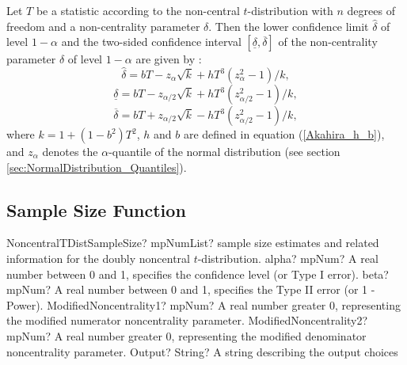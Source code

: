 \vspace{0.3cm}
Let $T$ be a statistic according to the non-central $t$-distribution
with $n$ degrees of freedom and a non-centrality parameter $\delta$. Then
the lower confidence limit $\widehat{\delta}$ of level $1-\alpha$ and the two-sided confidence interval $[ \underline{\delta},\overline{\delta}]$ of the
non-centrality parameter $\delta$ of level $1-\alpha$ are given by \cite{akahira_1995}:
\begin{equation}
\widehat{\delta} = bT - z_\alpha \sqrt{k} +  h T^3 (z_\alpha^2 - 1)/k,
\end{equation} 
\begin{equation}
\underline{\delta} = bT - z_{\alpha/2} \sqrt{k} +  h T^3 (z_{\alpha/2}^2 - 1)/k,
\end{equation} 
\begin{equation}
\overline{\delta} = bT + z_{\alpha/2} \sqrt{k} -  h T^3 (z_{\alpha/2}^2 - 1)/k,
\end{equation} 
where $k=1+(1-b^2)T^2$, $h$ and $b$ are defined in equation (\ref{Akahira_h_b}), and $z_\alpha$ denotes the $\alpha$-quantile of the normal distribution (see section \ref{sec:NormalDistribution_Quantiles}).





\subsection{Sample Size Function}
\label{NoncentralTDistributionSampleSize}

\begin{mpFunctionsExtract}
	\mpFunctionFiveNotImplemented
	{NoncentralTDistSampleSize? mpNumList? sample size estimates and related information for the doubly noncentral $t$-distribution.}
	{alpha? mpNum? A real number between 0 and 1, specifies the confidence level (or Type I error).}
	{beta? mpNum?  A real number between 0 and 1, specifies the Type II error (or 1 - Power).}
	{ModifiedNoncentrality1? mpNum? A real number greater 0, representing the modified numerator noncentrality parameter.}
	{ModifiedNoncentrality2? mpNum? A real number greater 0, representing the modified denominator noncentrality parameter.}
	{Output? String? A string describing the output choices}
\end{mpFunctionsExtract}

